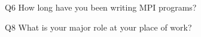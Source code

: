 \begin{description}%
\item{Q6} How long have you been writing MPI programs?%
\item{Q8} What is your major role at your place of work?%
\end{description}%
